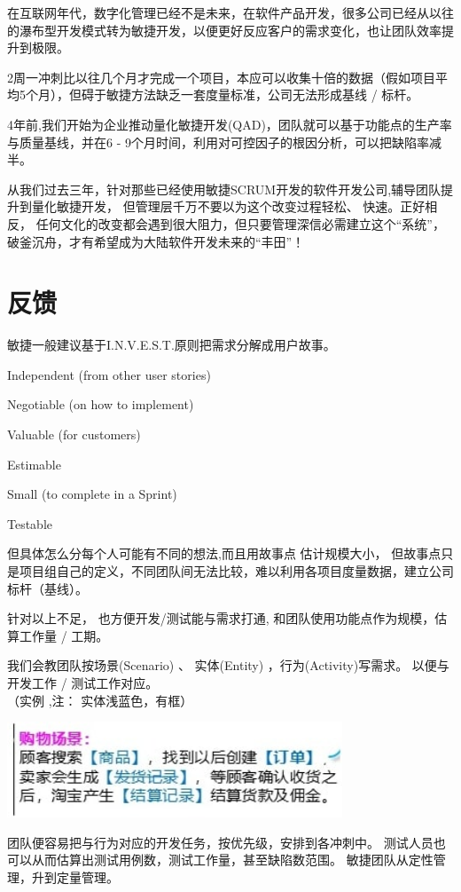 在互联网年代，数字化管理已经不是未来，在软件产品开发，很多公司已经从以往的瀑布型开发模式转为敏捷开发，以便更好反应客户的需求变化，也让团队效率提升到极限。

2周一冲刺比以往几个月才完成一个项目，本应可以收集十倍的数据（假如项目平均5个月），但碍于敏捷方法缺乏一套度量标准，公司无法形成基线
/ 标杆。

4年前,我们开始为企业推动量化敏捷开发(QAD)，团队就可以基于功能点的生产率与质量基线，并在6
- 9个月时间，利用对可控因子的根因分析，可以把缺陷率减半。

从我们过去三年，针对那些已经使用敏捷SCRUM开发的软件开发公司,辅导团队提升到量化敏捷开发，
但管理层千万不要以为这个改变过程轻松、 快速。正好相反，
任何文化的改变都会遇到很大阻力，但只要管理深信必需建立这个``系统''，破釜沉舟，才有希望成为大陆软件开发未来的``丰田''！

\hypertarget{ux53cdux9988}{%
\section{反馈}\label{ux53cdux9988}}


敏捷一般建议基于I.N.V.E.S.T.原则把需求分解成用户故事。

\begin{description}
\tightlist
\item[]
Independent (from other user stories)

Negotiable (on how to implement)

Valuable (for customers)

Estimable

Small (to complete in a Sprint)

Testable
\end{description}

但具体怎么分每个人可能有不同的想法,而且用故事点 估计规模大小，
但故事点只是项目组自己的定义，不同团队间无法比较，难以利用各项目度量数据，建立公司标杆（基线）。

针对以上不足， 也方便开发/测试能与需求打通,
和团队使用功能点作为规模，估算工作量 / 工期。

我们会教团队按场景(Scenario) 、 实体(Entity) ，行为(Activity)写需求。
以便与开发工作 / 测试工作对应。\\
（实例 ,注： 实体浅蓝色，有框）


\includegraphics[width=10cm]{场景1.jpg}

团队便容易把与行为对应的开发任务，按优先级，安排到各冲刺中。
测试人员也可以从而估算出测试用例数，测试工作量，甚至缺陷数范围。
敏捷团队从定性管理，升到定量管理。


\cite{drucker3References1}
\cite{drucker3References2}



